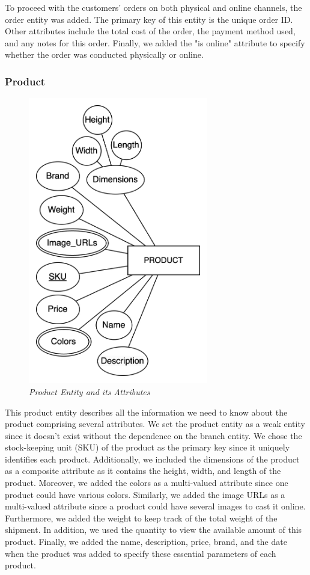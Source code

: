 To proceed with the customers' orders on both physical and online channels, the order entity was added. The primary key of this entity is the unique order ID. Other attributes include the total cost of the order, the payment method used, and any notes for this order. Finally, we added the "is online" attribute to specify whether the order was conducted physically or online.

\subsubsection{Product}
\begin{figure}[H]
  \centering
  \includegraphics[width=0.7\textwidth]{images/entities/product.png}
  \caption{\textit{Product Entity and its Attributes}}
\end{figure}

This product entity describes all the information we need to know about the product comprising several attributes. We set the product entity as a weak entity since it doesn't exist without the dependence on the branch entity. We chose the stock-keeping unit (SKU) of the product as the primary key since it uniquely identifies each product. Additionally, we included the dimensions of the product as a composite attribute as it contains the height, width, and length of the product. Moreover, we added the colors as a multi-valued attribute since one product could have various colors. Similarly, we added the image URLs as a multi-valued attribute since a product could have several images to cast it online. Furthermore, we added the weight to keep track of the total weight of the shipment. In addition, we used the quantity to view the available amount of this product. Finally, we added the name, description, price, brand, and the date when the product was added to specify these essential parameters of each product.

